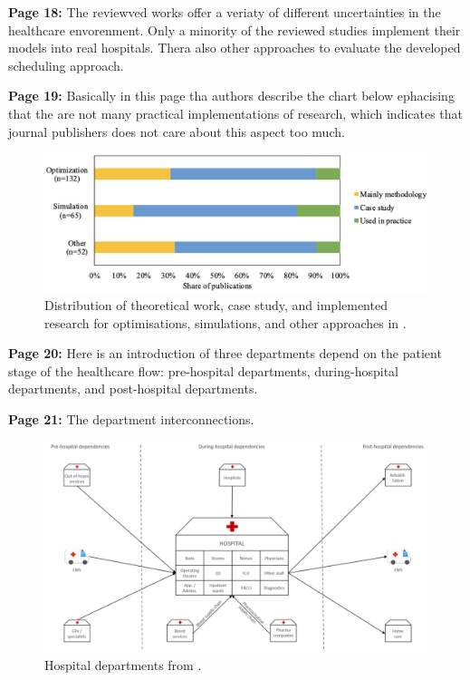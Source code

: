     \textbf{Page 18:}
    The reviewved works offer a veriaty of different uncertainties in the healthcare envorenment. Only a minority of the reviewed studies implement their models into real hospitals. Thera also other approaches to evaluate the developed scheduling approach.

    \textbf{Page 19:}
    Basically in this page tha authors describe the chart below ephacising that the are not many practical implementations of research, which indicates that journal publishers does not care about this aspect too much.
    \begin{figure}[H]
        \centering
        \includegraphics[width=1\textwidth]{figures/0010_SR02NL23/fig8.png}
        \caption{Distribution of theoretical work, case study, and implemented research for optimisations, simulations, and other approaches in \cite{x338}.}
        \label{fig8:0010_SR02NL23}
    \end{figure}
    
    \textbf{Page 20:}
    Here is an introduction of three departments depend on the patient stage of the healthcare flow: pre-hospital departments, during-hospital departments, and post-hospital departments.
    
    \textbf{Page 21:}
    The department interconnections.
    \begin{figure}[H]
        \centering
        \includegraphics[width=1\textwidth]{figures/0010_SR02NL23/fig9.png}
        \caption{Hospital departments from \cite{x338}.}
        \label{fig9:0010_SR02NL23}
    \end{figure}
    
